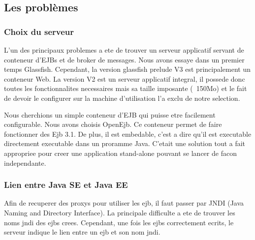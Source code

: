 \subsection{Les problèmes}
\subsubsection{Choix du serveur}
L'un des principaux problemes a ete de trouver un serveur applicatif servant de conteneur d'EJBs et de broker de messages. Nous avons essaye dans un premier temps Glassfish. Cependant, la version glassfish prelude V3 est principalement un conteneur Web. La version V2 est un serveur applicatif integral, il possede donc toutes les fonctionnalites necessaires mais sa taille imposante (~150Mo) et le fait de devoir le configurer sur la machine d'utilisation l'a exclu de notre selection.

Nous cherchions un simple conteneur d'EJB qui puisse etre facilement configurable. Nous avons choisis OpenEjb. Ce conteneur permet de faire fonctionner des Ejb 3.1. De plus, il est embedable, c'est a dire qu'il est executable directement executable dans un proramme Java. C'etait une solution tout a fait appropriee pour creer une application stand-alone pouvant se lancer de facon independante.
\subsubsection{Lien entre Java SE et Java EE}
Afin de recuperer des proxys pour utiliser les ejb, il faut passer par JNDI (Java Naming and Directory Interface). La principale difficulte a ete de trouver les noms jndi des ejbs crees. Cependant, une fois les ejbs correctement ecrits, le serveur indique le lien entre un ejb et son nom jndi.